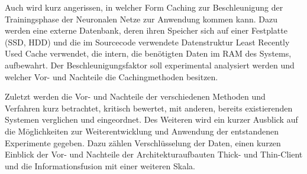 Auch wird kurz angerissen, in welcher Form Caching zur Beschleunigung der Trainingsphase der Neuronalen Netze zur Anwendung kommen kann. Dazu werden eine externe Datenbank, deren ihren Speicher sich auf einer Festplatte (SSD, HDD) und die im Sourcecode verwendete Datenstruktur Least Recently Used Cache verwendet, die intern, die benötigten Daten im RAM des Systems, aufbewahrt. Der Beschleunigungsfaktor soll experimental analysiert werden und welcher Vor- und Nachteile die Cachingmethoden besitzen.

Zuletzt werden die Vor- und Nachteile der verschiedenen Methoden und Verfahren kurz betrachtet, kritisch bewertet, mit anderen, bereits existierenden Systemen verglichen und eingeordnet. Des Weiteren wird ein kurzer Ausblick auf die Möglichkeiten zur Weiterentwicklung und Anwendung der entstandenen Experimente gegeben. Dazu zählen Verschlüsselung der Daten, einen kurzen Einblick der Vor- und Nachteile der Architekturaufbauten Thick- und Thin-Client und die Informationsfusion mit einer weiteren Skala.
